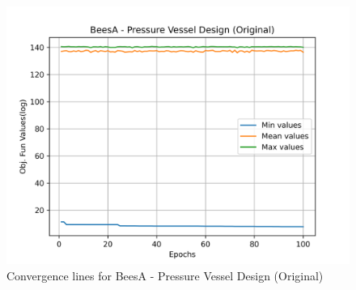 \begin{figure}[H]
        \centering
        \caption{Convergence lines for BeesA - Pressure Vessel Design (Original)}
        \label{fig:pressure_vessel_problem_original_solve_beesa}
        \includegraphics[scale=0.5]{images/pressure_vessel_problem_original_solve_beesa.png}
        \end{figure}
        